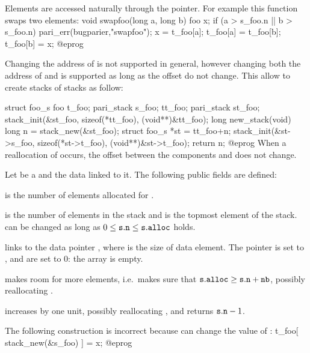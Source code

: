 Elements are accessed naturally through the  pointer.
For example this function swaps two elements:
\bprog
void swapfoo(long a, long b)
{
  foo x;
  if (a > s_foo.n || b > s_foo.n) pari_err(bugparier,"swapfoo");
  x        = t_foo[a];
  t_foo[a] = t_foo[b];
  t_foo[b] = x;
}
@eprog

Changing the address of  is not supported in general,
however changing both the address of  and 
is supported as long as the offset  do not change.
This allow to create stacks of stacks as follow:

\bprog
struct foo_s
{
  foo t_foo;
  pari_stack s_foo;
} tt_foo;
pari_stack st_foo;
stack_init(&st_foo, sizeof(*tt_foo), (void**)&tt_foo);
long new_stack(void)
{
  long n = stack_new(&st_foo);
  struct foo_s *st = tt_foo+n;
  stack_init(&st->s_foo, sizeof(*st->t_foo), (void**)&st->t_foo);
  return n;
}
@eprog
When a reallocation of  occurs, the offset between the components
 and  does not change.

Let  be a  and  the data linked to it. The
following public fields are defined:

\item {} is the number of elements allocated for .

\item {} is the number of elements in the stack and  is
the topmost element of the stack.   can be changed as long as
$0\leq{\tt s.n}\leq{\tt s.alloc}$ holds.

 links
 to the data pointer , where  is the size of
data element. The pointer  is set to ,  and
 are set to $0$: the array is empty.

 makes room for  more
elements, i.e.~makes sure that ${\tt s.alloc}\geq{\tt s.n} + {\tt nb}$, possibly
reallocating .

 increases  by one unit,
possibly reallocating , and returns ${\tt s.n}-1$.

 The following construction is incorrect because
 can change the value of :
\bprog
t_foo[ stack_new(&s_foo) ] = x;
@eprog


